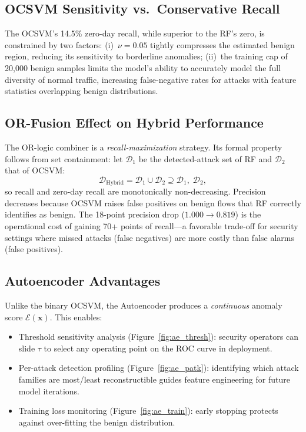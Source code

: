 \documentclass[10pt,conference]{IEEEtran}
\begin{document}
\subsection{OCSVM Sensitivity vs.\ Conservative Recall}

The OCSVM's 14.5\% zero-day recall, while superior to the RF's zero,
is constrained by two factors: (i)~$\nu=0.05$ tightly compresses
the estimated benign region, reducing its sensitivity to borderline
anomalies; (ii)~the training cap of 20{,}000 benign samples limits
the model's ability to accurately model the full diversity of normal
traffic, increasing false-negative rates for attacks with feature
statistics overlapping benign distributions.

\subsection{OR-Fusion Effect on Hybrid Performance}

The OR-logic combiner is a \emph{recall-maximization} strategy. Its
formal property follows from set containment: let $\mathcal{D}_1$ be
the detected-attack set of RF and $\mathcal{D}_2$ that of OCSVM:
\begin{equation}
  \mathcal{D}_\text{Hybrid}
  = \mathcal{D}_1 \cup \mathcal{D}_2
  \supseteq \mathcal{D}_1,\;\mathcal{D}_2,
\end{equation}
so recall and zero-day recall are monotonically non-decreasing.
Precision decreases because OCSVM raises false positives on benign
flows that RF correctly identifies as benign. The 18-point precision
drop ($1.000 \to 0.819$) is the operational cost of gaining 70+ points
of recall—a favorable trade-off for security settings where missed
attacks (false negatives) are more costly than false alarms
(false positives).

\subsection{Autoencoder Advantages}

Unlike the binary OCSVM, the Autoencoder produces a \emph{continuous}
anomaly score $\mathcal{E}(\mathbf{x})$. This enables:
\begin{itemize}[leftmargin=*,noitemsep]
  \item Threshold sensitivity analysis (Figure~\ref{fig:ae_thresh}):
        security operators can slide $\tau$ to select any operating
        point on the ROC curve in deployment.
  \item Per-attack detection profiling (Figure~\ref{fig:ae_patk}):
        identifying which attack families are most/least reconstructible
        guides feature engineering for future model iterations.
  \item Training loss monitoring (Figure~\ref{fig:ae_train}):
        early stopping protects against over-fitting the benign
        distribution.
\end{itemize}
\end{document}
